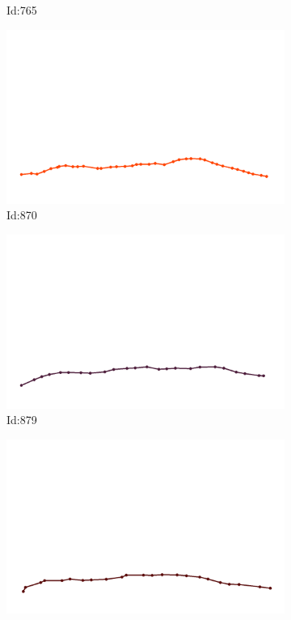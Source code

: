 \documentclass[12pt,twoside]{report}
\begin{document}
\begin{figure}
\begin{subfigure}[b]{0.20\textwidth}
\caption{Id:765}
\end{subfigure}
\begin{subfigure}[b]{0.20\textwidth}
\centering
\includegraphics[width=\textwidth]{../../trajectories/870.png}
\caption{Id:870}
\end{subfigure}
\begin{subfigure}[b]{0.20\textwidth}
\centering
\includegraphics[width=\textwidth]{../../trajectories/879.png}
\caption{Id:879}
\end{subfigure}
\begin{subfigure}[b]{0.20\textwidth}
\centering
\includegraphics[width=\textwidth]{../../trajectories/883.png}

\end{subfigure}
\end{figure}
\end{document}
